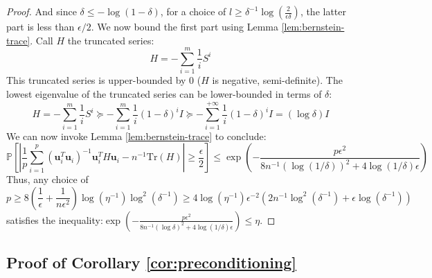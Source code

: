\begin{proof}
And since $\delta\le-\log\left(1-\delta\right)$, for a choice of
$l\geq\delta^{-1}\log\left(\frac{2}{\epsilon\delta}\right)$, the
latter part is less than $\epsilon/2$. We now bound the first part
using Lemma \ref{lem:bernstein-trace}. Call $H$ the truncated series:
\[
H=-\sum_{i=1}^{m}\frac{1}{i}S^{i}
\]
This truncated series is upper-bounded by $0$ ($H$ is negative,
semi-definite). The lowest eigenvalue of the truncated series can
be lower-bounded in terms of $\delta$: 
\[
H=-\sum_{i=1}^{m}\frac{1}{i}S^{i}\succeq-\sum_{i=1}^{m}\frac{1}{i}\left(1-\delta\right)^{i}I\succeq-\sum_{i=1}^{+\infty}\frac{1}{i}\left(1-\delta\right)^{i}I=\left(\log\delta\right)I
\]
We can now invoke Lemma \ref{lem:bernstein-trace} to conclude: 
\[
\mathbb{P}\left[\left|\frac{1}{p}\sum_{i=1}^{p}\left(\mathbf{u}_{i}^{T}\mathbf{u}_{i}\right)^{-1}\mathbf{u}_{i}^{T}H\mathbf{u}_{i}-n^{-1}\mbox{Tr}\left(H\right)\right|\geq\frac{\epsilon}{2}\right]\leq\exp\left(-\frac{p\epsilon^{2}}{8n^{-1}\left(\log\left(1/\delta\right)\right)^{2}+4\log\left(1/\delta\right)\epsilon}\right)
\]
Thus, any choice of 
\[
p\geq8\left(\frac{1}{\epsilon}+\frac{1}{n\epsilon^{2}}\right)\log\left(\eta^{-1}\right)\log^{2}\left(\delta^{-1}\right)\geq4\log\left(\eta^{-1}\right)\epsilon^{-2}\left(2n^{-1}\log^{2}\left(\delta^{-1}\right)+\epsilon\log\left(\delta^{-1}\right)\right)
\]
satisfies the inequality:$\exp\left(-\frac{p\epsilon^{2}}{8n^{-1}\left(\log\delta\right)^{2}+4\log\left(1/\delta\right)\epsilon}\right)\leq\eta$.

\end{proof}


\subsection{Proof of Corollary \ref{cor:preconditioning}}

